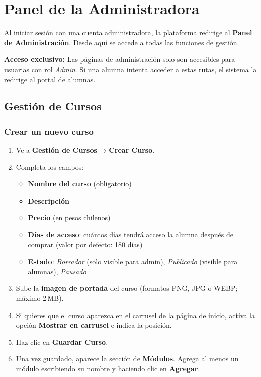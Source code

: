 \documentclass[a4paper,11pt]{article}
\begin{document}
\section{Panel de la Administradora}

Al iniciar sesi\'on con una cuenta administradora, la plataforma redirige al
\textbf{Panel de Administraci\'on}. Desde aqu\'i se accede a todas las funciones
de gesti\'on.

\begin{adminbox}
\textbf{Acceso exclusivo:} Las p\'aginas de administraci\'on solo son accesibles
para usuarias con rol \emph{Admin}. Si una alumna intenta acceder a estas rutas,
el sistema la redirige al portal de alumnas.
\end{adminbox}

\subsection{Gesti\'on de Cursos}

\subsubsection{Crear un nuevo curso}

\begin{enumerate}
  \item Ve a \textbf{Gesti\'on de Cursos} → \textbf{Crear Curso}.
  \item Completa los campos:
  \begin{itemize}
    \item \textbf{Nombre del curso} (obligatorio)
    \item \textbf{Descripci\'on}
    \item \textbf{Precio} (en pesos chilenos)
    \item \textbf{D\'ias de acceso}: cu\'antos d\'ias tendr\'a acceso la alumna
          despu\'es de comprar (valor por defecto: 180 d\'ias)
    \item \textbf{Estado}: \emph{Borrador} (solo visible para admin),
          \emph{Publicado} (visible para alumnas), \emph{Pausado}
  \end{itemize}
  \item Sube la \textbf{imagen de portada} del curso
        (formatos PNG, JPG o WEBP; m\'aximo 2\,MB).
  \item Si quieres que el curso aparezca en el carrusel de la p\'agina de inicio,
        activa la opci\'on \textbf{Mostrar en carrusel} e indica la posici\'on.
  \item Haz clic en \textbf{Guardar Curso}.
  \item Una vez guardado, aparece la secci\'on de \textbf{M\'odulos}. Agrega
        al menos un m\'odulo escribiendo su nombre y haciendo clic en \textbf{Agregar}.
\end{enumerate}
\end{document}
